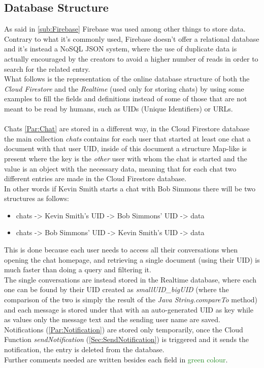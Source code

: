 \subsection{Database Structure}
\label{App:DatabaseStructure}
As said in \autoref{sub:Firebase} Firebase was used among other things to store data.\\
Contrary to what it's commonly used, Firebase doesn't offer a relational database and it's instead a NoSQL JSON system, where the use of duplicate data is actually encouraged by the creators to avoid a higher number of reads in order to search for the related entry.\\
What follows is the representation of the online database structure of both the \textit{Cloud Firestore} and the \textit{Realtime} (used only for storing chats) by using some examples to fill the fields and definitions instead of some of those that are not meant to be read by humans, such as UIDs (Unique Identifiers) or URLs. \\\\
Chats \autoref{Par:Chat} are stored in a different way, in the Cloud Firestore database the main collection \emph{chats} contains for each user that started at least one chat a document with that user UID, inside of this document a structure Map-like is present where the key is the \textit{other} user with whom the chat is started and the value is an object with the necessary data, meaning that for each chat two different entries are made in the Cloud Firestore database. \\
In other words if Kevin Smith starts a chat with Bob Simmons there will be two structures as follows:
\begin{itemize}
\item chats -> Kevin Smith's UID -> Bob Simmons' UID -> data
\item chats -> Bob Simmons' UID -> Kevin Smith's UID -> data
\end{itemize}
This is done because each user needs to access all their conversations when opening the chat homepage, and retrieving a single document (using their UID) is much faster than doing a query and filtering it.\\
The single conversations are instead stored in the Realtime database, where each one can be found by their UID created as \textit{smallUID\_bigUID} (where the comparison of the two is simply the result of the \textit{Java String.compareTo} method) and each message is stored under that with an auto-generated UID as key while as values only the message text and the sending user name are saved.\\
Notifications (\autoref{Par:Notification}) are stored only temporarily, once the Cloud Function \textit{sendNotification} (\autoref{Sec:SendNotification}) is triggered and it sends the notification, the entry is deleted from the database.\\
Further comments needed are written besides each field in \textcolor{ForestGreen}{green colour}.\\

